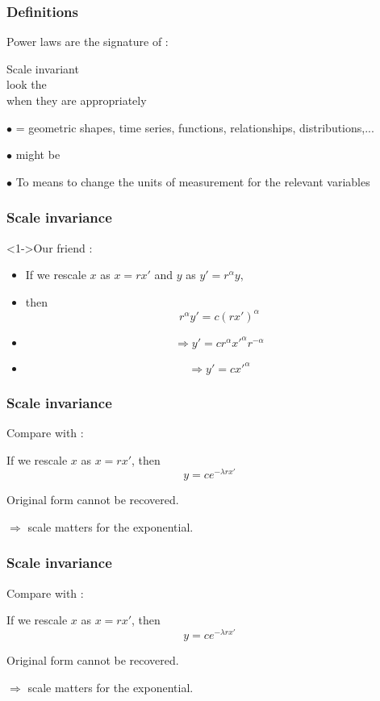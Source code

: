 \begin{frame}
  \frametitle{Definitions}

Power laws are the signature of :

Scale invariant \\
look the \\ 
when they are 
appropriately 

{\small $\bullet$  = geometric shapes, time series, functions, relationships, distributions,...}

{\small $\bullet$  might be }

{\small $\bullet$ To  means to change the units
of measurement for the relevant variables}


\end{frame}

\begin{frame}
  \frametitle{Scale invariance}

  \begin{block}<1->{Our friend :}
    \begin{itemize}
    \item<2->
    If we rescale $x$ as $x = rx'$ and $y$ as $y' = r^\alpha y$,
    \item<3->
    then
    $$r^\alpha y' = c (rx')^{\alpha}$$
    \item<4->
    $$\Rightarrow y' = c r^{\alpha} {x'}^{\alpha}r^{-\alpha}$$
    \item<5->
    $$\Rightarrow y' = c {x'}^{\alpha}$$
    \end{itemize}
  \end{block}

\end{frame}

\begin{frame}
  \frametitle{Scale invariance}
Compare with :

\inv
If we rescale $x$ as $x = rx'$, then
$$ y = c e^{-\lambda rx'} $$

Original form cannot be recovered.

$\Rightarrow$ scale matters for the exponential.

\end{frame}

\begin{frame}
  \frametitle{Scale invariance}

Compare with :

If we rescale $x$ as $x = rx'$, then
$$ y = c e^{-\lambda rx'} $$

\inv
Original form cannot be recovered.

$\Rightarrow$ scale matters for the exponential.

\end{frame}

